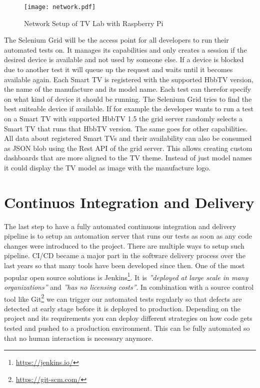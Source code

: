 \vspace{1cm}
\begin{figure}[htb]
  \centering
  \texttt{[image: network.pdf]}\\
  \caption{Network Setup of TV Lab with Raspberry Pi}\label{fig:network}
\end{figure}
\vspace{0.5cm}

The Selenium Grid will be the access point for all developers to run their automated tests on. It manages its capabilities and only creates a session if the desired device is available and not used by someone else. If a device is blocked due to another test it will queue up the request and waits until it becomes available again. Each Smart TV is registered with the supported HbbTV version, the name of the manufacture and its model name. Each test can therefor specify on what kind of device it should be running. The Selenium Grid tries to find the best suiteable device if available. If for example the developer wants to run a test on a Smart TV with supported HbbTV 1.5 the grid server randomly selects a Smart TV that runs that HbbTV version. The same goes for other capabilities. All data about registered Smart TVs and their availability can also be consumed as JSON blob using the Rest API of the grid server. This allows creating custom dashboards that are more aligned to the TV theme. Instead of just model names it could display the TV model as image with the manufacture logo.

\section{Continuos Integration and Delivery\label{sec:cicd}}

The last step to have a fully automated continuous integration and delivery pipeline is to setup an automation server that runs our tests as soon as any code changes were introduced to the project. There are multiple ways to setup such pipeline. CI/CD became a major part in the software delivery process over the last years so that many tools have been developed since then. One of the most popular open source solutions is Jenkins\footnote{\url{https://jenkins.io/}}. It is \textit{''deployed at large scale in many organizations''}\cite{jenkins} and \textit{''has no licensing costs''}\cite{jenkins}. In combination with a source control tool like Git\footnote{\url{https://git-scm.com/}} we can trigger our automated tests regularly so that defects are detected at early stage before it is deployed to production. Depending on the project and its requirements you can deploy different strategies on how code gets tested and pushed to a production environment. This can be fully automated so that no human interaction is necessary anymore.

